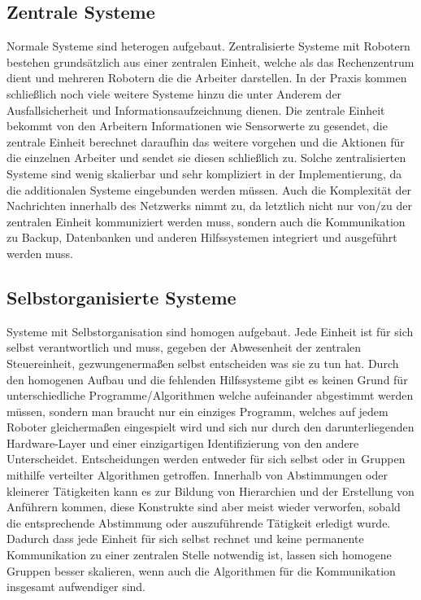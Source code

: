 \subsection*{Zentrale Systeme}\label{subsec:ZentraleSysteme}

Normale Systeme sind heterogen aufgebaut.
Zentralisierte Systeme mit Robotern bestehen grundsätzlich aus einer zentralen Einheit, welche als das Rechenzentrum dient und mehreren Robotern die die Arbeiter darstellen.
In der Praxis kommen schließlich noch viele weitere Systeme hinzu die unter Anderem der Ausfallsicherheit und Informationsaufzeichnung dienen.
Die zentrale Einheit bekommt von den Arbeitern Informationen wie Sensorwerte zu gesendet, die zentrale Einheit berechnet daraufhin das weitere vorgehen und die Aktionen für die einzelnen Arbeiter und sendet sie diesen schließlich zu.
Solche zentralisierten Systeme sind wenig skalierbar und sehr kompliziert in der Implementierung, da die additionalen Systeme eingebunden werden müssen.
Auch die Komplexität der Nachrichten innerhalb des Netzwerks nimmt zu, da letztlich nicht nur von/zu der zentralen Einheit kommuniziert werden muss, sondern auch die Kommunikation zu Backup, Datenbanken und anderen Hilfssystemen integriert und ausgeführt werden muss.

\subsection*{Selbstorganisierte Systeme}\label{subsec:SelbstorganisierteSysteme}

Systeme mit Selbstorganisation sind homogen aufgebaut.
Jede Einheit ist für sich selbst verantwortlich und muss, gegeben der Abwesenheit der zentralen Steuereinheit, gezwungenermaßen selbst entscheiden was sie zu tun hat.
Durch den homogenen Aufbau und die fehlenden Hilfssysteme gibt es keinen Grund für unterschiedliche Programme/Algorithmen welche aufeinander abgestimmt werden müssen, sondern man braucht nur ein einziges Programm, welches auf jedem Roboter gleichermaßen eingespielt wird und sich nur durch den darunterliegenden Hardware-Layer und einer einzigartigen Identifizierung von den andere Unterscheidet.
Entscheidungen werden entweder für sich selbst oder in Gruppen mithilfe verteilter Algorithmen getroffen.
Innerhalb von Abstimmungen oder kleinerer Tätigkeiten kann es zur Bildung von Hierarchien und der Erstellung von Anführern kommen, diese Konstrukte sind aber meist wieder verworfen, sobald die entsprechende Abstimmung oder auszuführende Tätigkeit erledigt wurde.
Dadurch dass jede Einheit für sich selbst rechnet und keine permanente Kommunikation zu einer zentralen Stelle notwendig ist, lassen sich homogene Gruppen besser skalieren, wenn auch die Algorithmen für die Kommunikation insgesamt aufwendiger sind.

